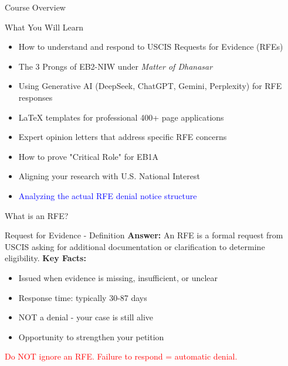 \documentclass[11pt]{beamer}
\begin{document}
	\begin{frame}{Course Overview}
		\scriptsize
		\begin{block}{What You Will Learn}
			\begin{itemize}
				\item How to understand and respond to USCIS Requests for Evidence (RFEs)
				\item The 3 Prongs of EB2-NIW under \textit{Matter of Dhanasar}
				\item Using Generative AI (DeepSeek, ChatGPT, Gemini, Perplexity) for RFE responses
				\item LaTeX templates for professional 400+ page applications
				\item Expert opinion letters that address specific RFE concerns
				\item How to prove "Critical Role" for EB1A
				\item Aligning your research with U.S. National Interest
				\item \textcolor{blue}{Analyzing the actual RFE denial notice structure}
			\end{itemize}
		\end{block}
	\end{frame}
	
	\begin{frame}{What is an RFE?}
		\scriptsize
		\begin{block}{Request for Evidence - Definition}
			\textbf{Answer:} An RFE is a formal request from USCIS asking for additional documentation or clarification to determine eligibility.
			\vspace{0.2cm}
			\textbf{Key Facts:}
			\begin{itemize}
				\item Issued when evidence is missing, insufficient, or unclear
				\item Response time: typically 30-87 days
				\item NOT a denial - your case is still alive
				\item Opportunity to strengthen your petition
			\end{itemize}
			\textcolor{red}{Do NOT ignore an RFE. Failure to respond = automatic denial.}
		\end{block}
	\end{frame}
	
\end{document}
